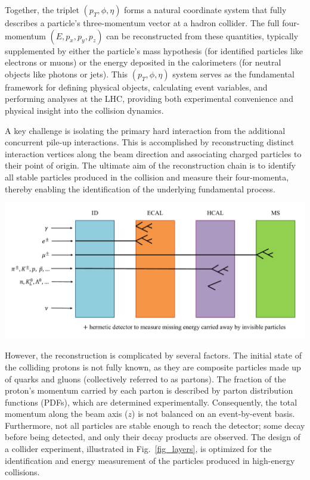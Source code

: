 Together, the triplet $(p_T, \phi, \eta)$ forms a natural coordinate system that fully describes a particle's three-momentum vector at a hadron collider. The full four-momentum $(E, p_x, p_y, p_z)$ can be reconstructed from these quantities, typically supplemented by either the particle's mass hypothesis (for identified particles like electrons or muons) or the energy deposited in the calorimeters (for neutral objects like photons or jets). This $(p_T, \phi, \eta)$ system serves as the fundamental framework for defining physical objects, calculating event variables, and performing analyses at the LHC, providing both experimental convenience and physical insight into the collision dynamics.

A key challenge is isolating the primary hard interaction from the additional concurrent pile-up interactions. This is accomplished by reconstructing distinct interaction vertices along the beam direction and associating charged particles to their point of origin. The ultimate aim of the reconstruction chain is to identify all stable particles produced in the collision and measure their four-momenta, thereby enabling the identification of the underlying fundamental process.

\begin{center}
    \includegraphics[width=\textwidth]{Images/Layers.pdf}
    \label{fig_layers}
\end{center}

However, the reconstruction is complicated by several factors. The initial state of the colliding protons is not fully known, as they are composite particles made up of quarks and gluons (collectively referred to as partons). The fraction of the proton's momentum carried by each parton is described by parton distribution functions (PDFs), which are determined experimentally. Consequently, the total momentum along the beam axis ($z$) is not balanced on an event-by-event basis. Furthermore, not all particles are stable enough to reach the detector; some decay before being detected, and only their decay products are observed. The design of a collider experiment, illustrated in Fig.~\ref{fig_layers}, is optimized for the identification and energy measurement of the particles produced in high-energy collisions.

